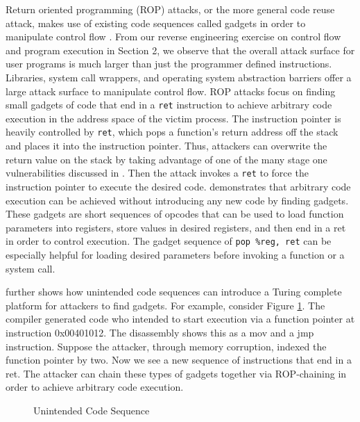 \documentclass[preprint,12pt]{elsarticle}
\begin{document}
Return oriented programming (ROP) attacks, or the more general code reuse attack, makes use of existing code sequences called gadgets in order to manipulate control flow \cite{shacham2007geometry}. From our reverse engineering exercise on control flow and program execution in Section 2, we observe that the overall attack surface for user programs is much larger than just the programmer defined instructions. Libraries, system call wrappers, and operating system abstraction barriers offer a large attack surface to manipulate control flow. ROP attacks focus on finding small gadgets of code that end in a \texttt{ret} instruction to achieve arbitrary code execution in the address space of the victim process. The instruction pointer is heavily controlled by \texttt{ret}, which pops a function's return address off the stack and places it into the instruction pointer. Thus, attackers can overwrite the return value on the stack by taking advantage of one of the many stage one vulnerabilities discussed in \cite{szekeres2013sok}. Then the attack invokes a \texttt{ret} to force the instruction pointer to execute the desired code. \cite{shacham2007geometry} demonstrates that arbitrary code execution can be achieved without introducing any new code by finding gadgets. These gadgets are short sequences of opcodes that can be used to load function parameters into registers, store values in desired registers, and then end in a ret in order to control execution. The gadget sequence of \texttt{pop \%reg, ret} can be especially helpful for loading desired parameters before invoking a function or a system call.

\cite{shacham2007geometry} further shows how unintended code sequences can introduce a Turing complete platform for attackers to find gadgets. For example, consider Figure \ref{fig:Gadget}. The compiler generated code who intended to start execution via a function pointer at instruction 0x00401012. The disassembly shows this as a mov and a jmp instruction. Suppose the attacker, through memory corruption, indexed the function pointer by two. Now we see a new sequence of instructions that end in a ret. The attacker can chain these types of gadgets together via ROP-chaining in order to achieve arbitrary code execution.

\begin{figure}[ht]
\centering{}
\caption{Unintended Code Sequence}
\label{fig:Gadget}
\end{figure}
\end{document}
